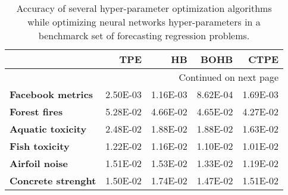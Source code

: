\begin{longtable}{lrrrr}
\caption{Accuracy of several hyper-parameter optimization algorithms while optimizing neural networks hyper-parameters in a benchmarck set of forecasting regression problems.}\label{nn-accuracy}\\
\toprule
{} &      TPE &       HB &     BOHB &     CTPE \\
\midrule
\endhead
\midrule
\multicolumn{5}{r}{{Continued on next page}} \\
\midrule
\endfoot

\bottomrule
\endlastfoot
\textbf{Facebook metrics } & 2.50E-03 & 1.16E-03 & 8.62E-04 & 1.69E-03 \\
\textbf{Forest fires     } & 5.28E-02 & 4.66E-02 & 4.65E-02 & 4.27E-02 \\
\textbf{Aquatic toxicity } & 2.48E-02 & 1.88E-02 & 1.88E-02 & 1.63E-02 \\
\textbf{Fish toxicity    } & 1.22E-02 & 1.16E-02 & 1.10E-02 & 1.01E-02 \\
\textbf{Airfoil noise    } & 1.51E-02 & 1.53E-02 & 1.33E-02 & 1.19E-02 \\
\textbf{Concrete strenght} & 1.50E-02 & 1.74E-02 & 1.47E-02 & 1.51E-02 \\
\end{longtable}
